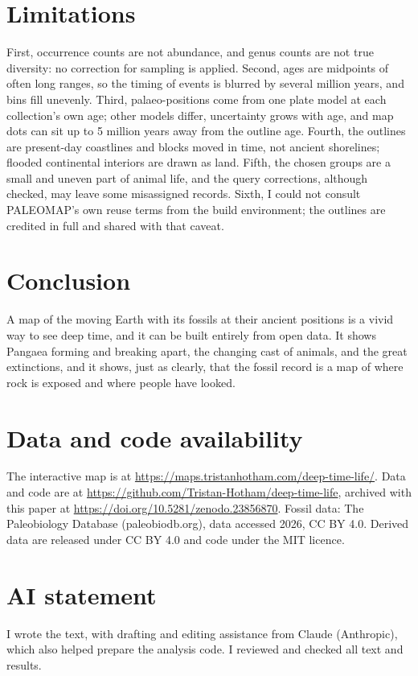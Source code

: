 \documentclass[11pt,a4paper]{article}
\begin{document}
\section{Limitations}
First, occurrence counts are not abundance, and genus counts are not true diversity: no correction for sampling is applied. Second, ages are midpoints of often long ranges, so the timing of events is blurred by several million years, and bins fill unevenly. Third, palaeo-positions come from one plate model at each collection's own age; other models differ, uncertainty grows with age, and map dots can sit up to 5 million years away from the outline age. Fourth, the outlines are present-day coastlines and blocks moved in time, not ancient shorelines; flooded continental interiors are drawn as land. Fifth, the chosen groups are a small and uneven part of animal life, and the query corrections, although checked, may leave some misassigned records. Sixth, I could not consult PALEOMAP's own reuse terms from the build environment; the outlines are credited in full and shared with that caveat.

\section{Conclusion}
A map of the moving Earth with its fossils at their ancient positions is a vivid way to see deep time, and it can be built entirely from open data. It shows Pangaea forming and breaking apart, the changing cast of animals, and the great extinctions, and it shows, just as clearly, that the fossil record is a map of where rock is exposed and where people have looked.

\section*{Data and code availability}
The interactive map is at \url{https://maps.tristanhotham.com/deep-time-life/}. Data and code are at \url{https://github.com/Tristan-Hotham/deep-time-life}, archived with this paper at \url{https://doi.org/10.5281/zenodo.23856870}. Fossil data: The Paleobiology Database (paleobiodb.org), data accessed 2026, CC BY 4.0. Derived data are released under CC BY 4.0 and code under the MIT licence.

\section*{AI statement}
I wrote the text, with drafting and editing assistance from Claude (Anthropic), which also helped prepare the analysis code. I reviewed and checked all text and results.
\end{document}
